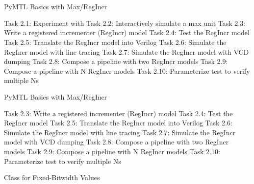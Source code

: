 
\section[{\it Hands-On} Max/RegIncr]{}

\begin{frame}{ PyMTL Basics with Max/RegIncr}
\begin{cbxlist}
  \1 Task 2.1: Experiment with 
  \1 Task 2.2: Interactively simulate a max unit
  \1 Task 2.3: Write a registered incrementer (RegIncr) model
  \1 Task 2.4: Test the RegIncr model
  \1 Task 2.5: Translate the RegIncr model into Verilog
  \1 Task 2.6: Simulate the RegIncr model with line tracing
  \1 Task 2.7: Simulate the RegIncr model with VCD dumping
  \1 Task 2.8: Compose a pipeline with two RegIncr models
  \1 Task 2.9: Compose a pipeline with N RegIncr models
  \1 Task 2.10: Parameterize test to verify multiple Ns
\end{cbxlist}
\end{frame}

\begin{frame}{ PyMTL Basics with Max/RegIncr}
\begin{cbxlist}
  \1 
  \1 
  \1 Task 2.3: Write a registered incrementer (RegIncr) model
  \1 Task 2.4: Test the RegIncr model
  \1 Task 2.5: Translate the RegIncr model into Verilog
  \1 Task 2.6: Simulate the RegIncr model with line tracing
  \1 Task 2.7: Simulate the RegIncr model with VCD dumping
  \1 Task 2.8: Compose a pipeline with two RegIncr models
  \1 Task 2.9: Compose a pipeline with N RegIncr models
  \1 Task 2.10: Parameterize test to verify multiple Ns
\end{cbxlist}
\end{frame}

\begin{frame}[fragile]{ Class for Fixed-Bitwidth Values}
\end{frame}

